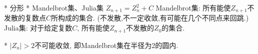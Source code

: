 * 分形
	* Mandelbrot集、Julia集
		\Define
			$Z_{n+1} = Z_n^2 + C$
			Mandelbrot集: 所有能使$Z_{n+1}$不发散的复数点$C$所构成的集合. (不发散,不一定收敛,有可能在几个不同点来回跳.)
			Julia集: 对于给定复数$C$, 所有能使$Z_{n+1}$不发散的$Z_0$的集合.

		\Property
			* $|Z_n|>2$不可能收敛, 即Mandelbrot集在半径为2的圆内.
